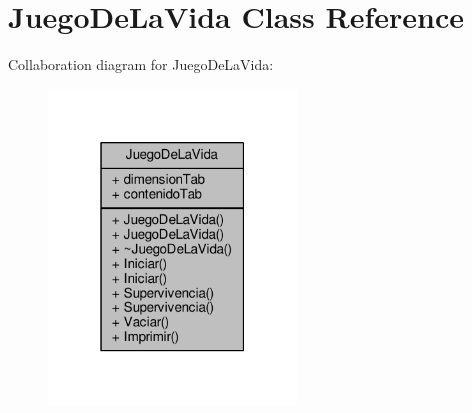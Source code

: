 \hypertarget{class_juego_de_la_vida}{\section{Juego\+De\+La\+Vida Class Reference}
\label{class_juego_de_la_vida}
}


Collaboration diagram for Juego\+De\+La\+Vida\+:
\nopagebreak
\begin{figure}[H]
\begin{center}
\leavevmode
\includegraphics[width=187pt]{class_juego_de_la_vida__coll__graph}
\end{center}
\end{figure}
